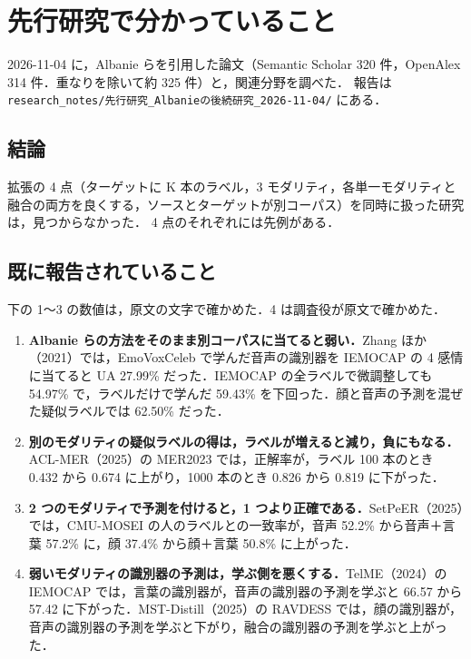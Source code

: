 \documentclass[11pt,a4paper]{ltjsarticle}
\begin{document}
\section{先行研究で分かっていること}

2026-11-04 に，Albanie らを引用した論文（Semantic Scholar 320 件，OpenAlex 314 件．重なりを除いて約 325 件）と，関連分野を調べた．
報告は \texttt{research\_notes/先行研究\_Albanieの後続研究\_2026-11-04/} にある．

\subsection{結論}

拡張の 4 点（ターゲットに K 本のラベル，3 モダリティ，各単一モダリティと融合の両方を良くする，ソースとターゲットが別コーパス）を同時に扱った研究は，見つからなかった．
4 点のそれぞれには先例がある．

\subsection{既に報告されていること}

下の 1〜3 の数値は，原文の文字で確かめた．4 は調査役が原文で確かめた．
\begin{enumerate}
  \item \textbf{Albanie らの方法をそのまま別コーパスに当てると弱い．}Zhang ほか（2021）では，EmoVoxCeleb で学んだ音声の識別器を IEMOCAP の 4 感情に当てると UA 27.99\% だった．IEMOCAP の全ラベルで微調整しても 54.97\% で，ラベルだけで学んだ 59.43\% を下回った．顔と音声の予測を混ぜた疑似ラベルでは 62.50\% だった．
  \item \textbf{別のモダリティの疑似ラベルの得は，ラベルが増えると減り，負にもなる．}ACL-MER（2025）の MER2023 では，正解率が，ラベル 100 本のとき 0.432 から 0.674 に上がり，1000 本のとき 0.826 から 0.819 に下がった．
  \item \textbf{2 つのモダリティで予測を付けると，1 つより正確である．}SetPeER（2025）では，CMU-MOSEI の人のラベルとの一致率が，音声 52.2\% から音声＋言葉 57.2\% に，顔 37.4\% から顔＋言葉 50.8\% に上がった．
  \item \textbf{弱いモダリティの識別器の予測は，学ぶ側を悪くする．}TelME（2024）の IEMOCAP では，言葉の識別器が，音声の識別器の予測を学ぶと 66.57 から 57.42 に下がった．MST-Distill（2025）の RAVDESS では，顔の識別器が，音声の識別器の予測を学ぶと下がり，融合の識別器の予測を学ぶと上がった．
\end{enumerate}
\end{document}

